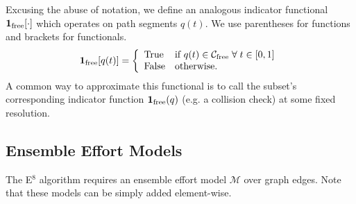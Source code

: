 Excusing the abuse of notation,
we define an analogous indicator functional
$\mathbf{1}_{\mbox{\scriptsize free}}[\cdot]$
which operates on path segments $q(t)$.
We use parentheses for functions and brackets for functionals.
\begin{equation}
  \mathbf{1}_{\mbox{\scriptsize free}}[q(t)] =
    \left\{ \begin{array}{ll}
      \mbox{True} & \mbox{if } q(t) \in \mathcal{C}_{\mbox{\scriptsize free}}
         \;\forall\; t \in [0,1] \\
      \mbox{False} & \mbox{otherwise}.
    \end{array} \right.
  \label{eqn:single-indicator-functional}
\end{equation}
A common way to approximate this functional is to call the subset's
corresponding indicator function ${\bf 1}_{\mbox{\scriptsize free}}(q)$
(e.g. a collision check) at some fixed resolution.

\subsection{Ensemble Effort Models}
\label{subsec:ensemble-effort-models}

The E$^8$ algorithm requires an ensemble effort model
$\mathcal{M}$ over graph edges.
Note that these models can be simply added element-wise.

